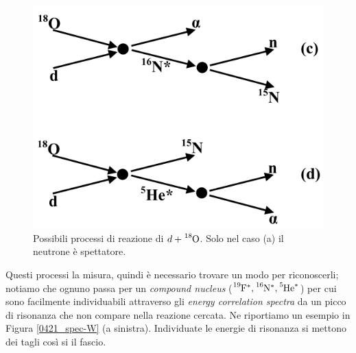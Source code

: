 \begin{enumerate}
\begin{figure}[h]
		\includegraphics[scale=0.5]{Immagini/0421_sch-cut2.png}
		\caption{Possibili processi di reazione di $d+\ce{^{18}O}$. Solo nel caso (a) il neutrone è spettatore.}
		\label{0421_sch}
	\end{figure}
	\noindent Questi processi  la misura, quindi è necessario trovare un modo per riconoscerli; notiamo che ognuno passa per un \textit{compound nucleus} ($\ce{^{19}F}^*, \ce{^{16}N}^*,\ce{^5He}^*$) per cui sono facilmente individuabili attraverso gli \textit{energy correlation spectra} da un picco di risonanza che non compare nella reazione cercata. Ne riportiamo un esempio in Figura \ref{0421_spec-W} (a sinistra). Individuate le energie di risonanza si mettono dei tagli così si  il fascio.
	\begin{figure}[h]
		\centering

\end{figure}
\end{enumerate}
